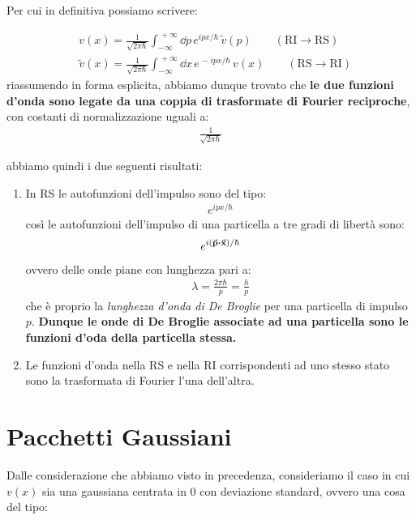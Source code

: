 	Per cui in definitiva possiamo scrivere:
	
\begin{mydef}
\begin{align*}
	& v(x) = \frac{1}{\sqrt{2\pi\hbar}} \int_{-\infty}^{\, +\infty} \dd p  \, e^{ipx/\hbar} \, \tilde{v}(p) \qquad (\text{RI} \to \text{RS}) \\
	& \tilde{v}(x) = \frac{1}{\sqrt{2\pi\hbar}} \int_{-\infty}^{\, +\infty} \dd x  \, e^{\, -ipx/\hbar} \, v(x) \qquad (\text{RS} \to \text{RI})
\end{align*}
	riassumendo in forma esplicita, abbiamo dunque trovato che \textbf{le due funzioni d'onda sono legate da una coppia di trasformate di Fourier reciproche}, con costanti di normalizzazione uguali a:
\begin{align*}
	 \frac{1}{\sqrt{2\pi\hbar}}
\end{align*}
\end{mydef}

	abbiamo quindi i due seguenti risultati:
	
\begin{enumerate}[label=\arabic*)]
	\item In RS le autofunzioni dell'impulso sono del tipo:
	\begin{align*}
		e^{ipx/\hbar}
	\end{align*}
		così le autofunzioni dell'impulso di una particella a tre gradi di libertà sono:
	\begin{align*}
		e^{i\qty(\va{p} \vdot \va{x})/\hbar}
	\end{align*}
		ovvero delle onde piane con lunghezza pari a:
	\begin{align*}
		\lambda = \frac{2\pi \hbar}{p} = \frac{h}{p}
	\end{align*}
		che è proprio la \textit{lunghezza d’onda di De Broglie} per una particella di impulso $p$. \textbf{Dunque le onde di De Broglie associate ad una particella sono le funzioni d’oda della particella stessa.}
		
	\item Le funzioni d'onda nella RS e nella RI corrispondenti ad uno stesso stato sono la trasformata di Fourier l'una dell'altra.
\end{enumerate}
	
\section{Pacchetti Gaussiani}

	Dalle considerazione che abbiamo visto in precedenza, consideriamo il caso in cui $v(x)$ sia una gaussiana centrata in $0$ con deviazione standard, ovvero una cosa del tipo:
	
